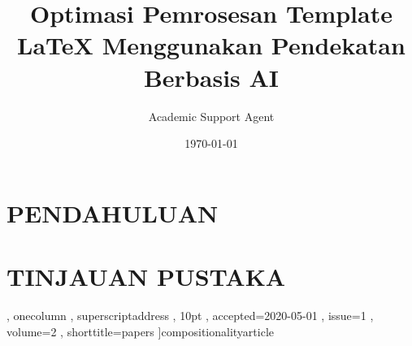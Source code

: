 \documentclass{compositionalityarticle}
\title{Optimasi Pemrosesan Template LaTeX Menggunakan Pendekatan Berbasis AI}
\author{Academic Support Agent}
\date{\today}
\begin{document}
\maketitle

\begin{abstract}

\end{abstract}

\chapter{PENDAHULUAN}


\chapter{TINJAUAN PUSTAKA}


              , onecolumn
              , superscriptaddress
              , 10pt
              , accepted=2020-05-01
              , issue=1
              , volume=2
              , shorttitle=papers
              ]{compositionalityarticle}
\usepackage[utf8]{inputenc}
\usepackage[english]{babel}
\usepackage[T1]{fontenc}
\usepackage{amsmath}
\usepackage{hyperref}

\usepackage{tikz}
\usepackage{lipsum}

\newtheorem{theorem}{Theorem}
\end{document}
